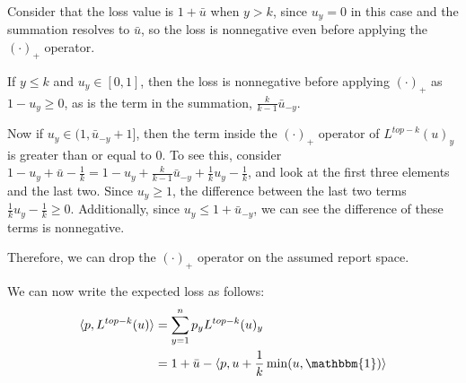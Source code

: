 \documentclass[12pt]{article}
\newcommand{\Comments}{1}
\newcommand{\mynote}[2]{\ifnum\Comments=1\textcolor{#1}{#2}\fi}
\newcommand{\jessie}[1]{\mynote{purple}{[JF: #1]}}
\newcommand{\ubar}{\bar{u}}
\newcommand{\inprod}[2]{\langle #1, #2 \rangle}%
\newcommand{\ones}{\mathbbm{1}}
\newcommand{\Ind}[1]{\mathbf{1}\{#1\}}
\begin{document}
Consider that the loss value is $1 + \bar u$ when $y > k$, since $u_y = 0$ in this case and the summation resolves to $\bar u$, so the loss is nonnegative even before applying the $(\cdot)_+$ operator.

If $y \leq k$ and $u_y \in [0,1]$, then the loss is nonnegative before applying $(\cdot)_+$ as $1-u_y \geq 0$, as is the term in the summation, $\frac k {k-1} \bar u_{-y}$.

Now if $u_y \in (1, \bar u_{-y} + 1]$, then the term inside the $(\cdot)_+$ operator of $L^{top-k}(u)_y$ is greater than or equal to $0$.
To see this, consider $1 - u_y + \bar u - \frac 1 k = 1 - u_y + \frac k {k-1} \bar u_{-y} + \frac 1 k u_y - \frac 1 k$, and look at the first three elements and the last two.
Since $u_y \geq 1$, the difference between the last two terms $\frac 1 k u_y - \frac 1 k \geq 0$.
Additionally, since $u_y \leq 1 +  \ubar_{-y}$, we can see the difference of these terms is nonnegative.

Therefore, we can drop the $(\cdot)_+$ operator on the assumed report space.

We can now write the expected loss as follows:
\begin{align*}
\inprod{p}{L^{top-k}(u)} &= \sum_{y=1}^n p_y L^{top-k}(u)_y \\
&= 1 + \ubar - \inprod{p}{u + \frac 1 k \min(u, \ones)}
\end{align*}
\end{document}

